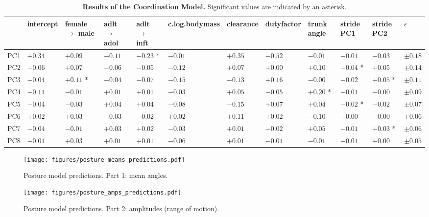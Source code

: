 \begin{landscape}
\begin{table}[htbp]
\caption{\label{tab:coordinationresults}\textbf{Results of the Coordination Model.} Significant values are indicated by an asterisk.}
\centering
\scriptsize
\begin{tabular}{llllllllllll}
 & intercept & female \(\rightarrow\) male & adlt \(\rightarrow\) adol & adlt \(\rightarrow\) inft & c.log.bodymass & clearance & dutyfactor & trunk angle & stride PC1 & stride PC2 & \(\epsilon\)\\[0pt]
\hline
PC1 & \(+0.34\) & \(+0.09\) & \(-0.11\) & \(-0.23\) * & \(-0.01\) & \(+0.35\) & \(-0.52\) & \(-0.01\) & \(-0.01\) & \(-0.03\) & \(\pm 0.18\)\\[0pt]
PC2 & \(-0.06\) & \(+0.07\) & \(-0.06\) & \(-0.05\) & \(-0.12\) & \(+0.07\) & \(+0.00\) & \(+0.10\) & \(+0.04\) * & \(+0.05\) & \(\pm 0.14\)\\[0pt]
PC3 & \(-0.04\) & \(+0.11\) * & \(-0.04\) & \(-0.07\) & \(-0.15\) & \(-0.13\) & \(+0.16\) & \(-0.00\) & \(-0.02\) & \(+0.05\) * & \(\pm 0.11\)\\[0pt]
PC4 & \(-0.11\) & \(-0.01\) & \(+0.01\) & \(+0.01\) & \(-0.03\) & \(+0.05\) & \(-0.05\) & \(+0.20\) * & \(-0.01\) & \(-0.00\) & \(\pm 0.09\)\\[0pt]
PC5 & \(-0.04\) & \(-0.03\) & \(+0.04\) & \(+0.04\) & \(-0.08\) & \(-0.15\) & \(+0.07\) & \(+0.04\) & \(-0.02\) * & \(-0.02\) & \(\pm 0.07\)\\[0pt]
PC6 & \(+0.02\) & \(+0.03\) & \(-0.03\) & \(-0.02\) & \(+0.02\) & \(+0.11\) & \(+0.02\) & \(-0.10\) & \(+0.00\) & \(-0.00\) & \(\pm 0.06\)\\[0pt]
PC7 & \(-0.04\) & \(-0.01\) & \(+0.03\) & \(+0.02\) & \(-0.03\) & \(+0.01\) & \(-0.02\) & \(+0.05\) & \(-0.01\) & \(+0.03\) * & \(\pm 0.06\)\\[0pt]
PC8 & \(-0.01\) & \(+0.03\) & \(+0.01\) & \(+0.01\) & \(-0.06\) & \(+0.01\) & \(-0.01\) & \(-0.01\) & \(-0.01\) & \(+0.00\) & \(\pm 0.05\)\\[0pt]
\end{tabular}
\end{table}
\end{landscape}


\begin{figure}[htbp]
\centering
\texttt{[image: figures/posture\_means\_predictions.pdf]}
\caption{\label{fig:posture1}Posture model predictions. Part 1: mean angles.}
\end{figure}

\begin{figure}[htbp]
\centering
\texttt{[image: figures/posture\_amps\_predictions.pdf]}
\caption{\label{fig:posture2}Posture model predictions. Part 2: amplitudes (range of motion).}
\end{figure}

